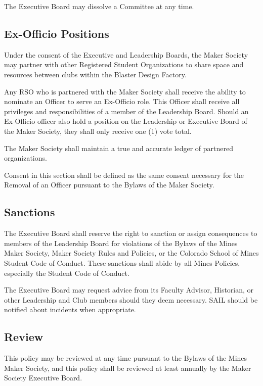 \documentclass[12pt,letterpaper]{article}
\begin{document}
The Executive Board may dissolve a Committee at any time.

\subsection{Ex-Officio Positions}

Under the consent of the Executive and Leadership Boards, the Maker Society may partner with other Registered Student Organizations to share space and resources between clubs within the Blaster Design Factory.

Any RSO who is partnered with the Maker Society shall receive the ability to nominate an Officer to serve an Ex-Officio role. This Officer shall receive all privileges and responsibilities of a member of the Leadership Board. Should an Ex-Officio officer also hold a position on the Leadership or Executive Board of the Maker Society, they shall only receive one (1) vote total.

The Maker Society shall maintain a true and accurate ledger of partnered organizations.

Consent in this section shall be defined as the same consent necessary for the Removal of an Officer pursuant to the Bylaws of the Maker Society.

\subsection{Sanctions}

The Executive Board shall reserve the right to sanction or assign consequences to members of the Leadership Board for violations of the Bylaws of the Mines Maker Society, Maker Society Rules and Policies, or the Colorado School of Mines Student Code of Conduct. These sanctions shall abide by all Mines Policies, especially the Student Code of Conduct.

The Executive Board may request advice from its Faculty Advisor, Historian, or other Leadership and Club members should they deem necessary. SAIL should be notified about incidents when appropriate.

\subsection{Review}

This policy may be reviewed at any time pursuant to the Bylaws of the Mines Maker Society, and this policy shall be reviewed at least annually by the Maker Society Executive Board.
\end{document}
